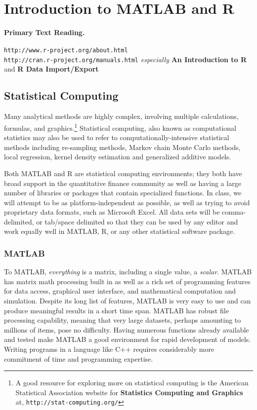\section{Introduction to MATLAB and R}
\paragraph{Primary Text Reading.}
\texttt{http://www.r-project.org/about.html} \\
\texttt{http://cran.r-project.org/manuals.html} \linebreak
\textit{especially} \textbf{An Introduction to R} and \textbf{R Data Import/Export}

\subsection{Statistical Computing}
Many analytical methods are highly complex, involving multiple calculations, formulas, and graphics.\footnote{A good resource for exploring more on statistical computing is the American Statistical Association website for \textbf{Statistics Computing and Graphics} at, \texttt{http://stat-computing.org/}}
Statistical computing, also known as computational statistics may also be used to refer to computationally-intensive statistical methods including re-sampling methods, Markov chain Monte Carlo methods, local regression, kernel density estimation and generalized additive models.

Both MATLAB and R are statistical computing environments; they both have broad support in the quantitative finance community as well as having a large number of libraries or packages that contain specialized functions. In class, we will attempt to be as platform-independent as possible, as well as trying to avoid proprietary data formats, such as Microsoft Excel. All data sets will be comma-delimited, or tab/space delimited so that they can be used by any editor and work equally well in MATLAB, R, or any other statistical software package.

\subsubsection{MATLAB}
To MATLAB, \emph{everything} is a matrix, including a single value, a \emph{scalar}. MATLAB has matrix math processing built in as well as a rich set of programming features for data access, graphical user interface, and mathematical computation and simulation. Despite its long list of features, MATLAB is very easy to use and can produce meaningful results in a short time span. MATLAB has robust file processing capability, meaning that very large datasets, perhaps amounting to millions of items, pose no difficulty. Having numerous functions already available and tested make MATLAB a good environment for rapid development of models. Writing programs in a language like C++ requires considerably more commitment of time and programming expertise.

